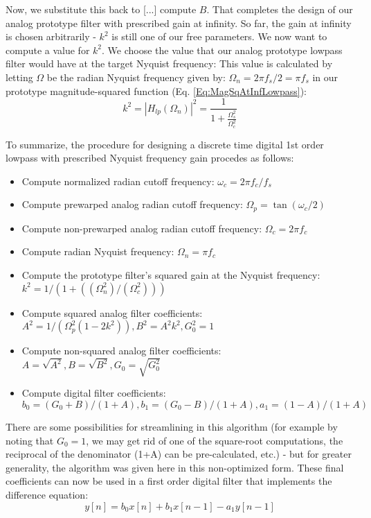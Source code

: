 Now, we substitute this back to [...] compute $B$. That completes the design of our analog prototype filter with prescribed gain at infinity. So far, the gain at infinity is chosen arbitrarily - $k^2$ is still one of our free parameters. We now want to compute a value for $k^2$. We choose the value that our analog prototype lowpass filter would have at the target Nyquist frequency: This value is calculated by letting $\Omega$ be the radian Nyquist frequency given by: $\Omega_n = 2 \pi f_s / 2 = \pi f_s$ in our prototype magnitude-squared function (Eq. \ref{Eq:MagSqAtInfLowpass}):
\begin{equation}
 k^2 = |H_{lp}(\Omega_n)|^2 = \frac{1}{1 + \frac{\Omega_s^2}{\Omega_c^2} }
\end{equation}

To summarize, the procedure for designing a discrete time digital 1st order lowpass with prescribed Nyquist frequency gain procedes as follows:
\begin{itemize}
	\item Compute normalized radian cutoff frequency: $\omega_c = 2 \pi f_c/f_s$
	\item Compute prewarped analog radian cutoff frequency: $\Omega_p = \tan(\omega_c/2)$		
	\item Compute non-prewarped analog radian cutoff frequency: $\Omega_c = 2 \pi f_c$		
	\item Compute radian Nyquist frequency: $\Omega_n = \pi f_c$
	\item Compute the prototype filter's squared gain at the Nyquist frequency: 	$k^2 = 1 / (1 + ((\Omega_n^2)/(\Omega_c^2)) )$
	\item Compute squared analog filter coefficients: $A^2 = 1 / (\Omega_p^2 (1-2k^2)), B^2 = A^2 k^2, G_0^2 = 1$
	\item Compute non-squared analog filter coefficients: $A=\sqrt{A^2}, B=\sqrt{B^2}, G_0=\sqrt{G_0^2}$	
	\item Compute digital filter coefficients: $b_0 = (G_0+B)/(1+A), b_1=(G_0-B)/(1+A), a_1=(1-A)/(1+A)$
\end{itemize}
There are some possibilities for streamlining in this algorithm (for example by noting that $G_0 = 1$, we may get rid of one of the square-root computations, the reciprocal of the denominator (1+A) can be pre-calculated, etc.) - but for greater generality, the algorithm was given here in this non-optimized form. These final coefficients can now be used in a first order digital filter that implements the difference equation:
\begin{equation}
 y[n] = b_0 x[n] + b_1 x[n-1] - a_1 y[n-1]
\end{equation}





